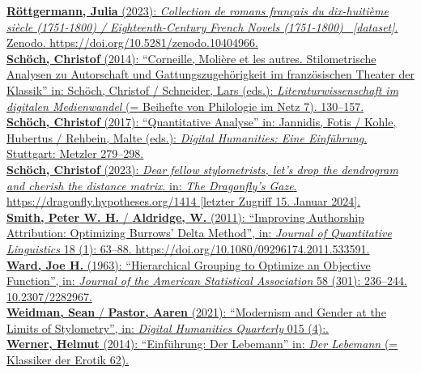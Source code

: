 \documentclass[
  letterpaper,
  DIV=11,
  numbers=noendperiod]{scrreprt}
\begin{document}
\href{https://www.zotero.org/google-docs/?4xA93b}{\textbf{Röttgermann,
Julia} (2023): \emph{Collection de romans français du dix-huitième
siècle (1751-1800) / Eighteenth-Century French Novels (1751-1800)~
{[}dataset{]}}. Zenodo. https://doi.org/10.5281/zenodo.10404966.}\\
\href{https://www.zotero.org/google-docs/?4xA93b}{\textbf{Schöch,
Christof} (2014): ``Corneille, Molière et les autres. Stilometrische
Analysen zu Autorschaft und Gattungszugehörigkeit im französischen
Theater der Klassik'' in: Schöch, Christof / Schneider, Lars (eds.):
\emph{Literaturwissenschaft im digitalen Medienwandel} (= Beihefte von
Philologie im Netz 7). 130--157.}\\
\href{https://www.zotero.org/google-docs/?4xA93b}{\textbf{Schöch,
Christof} (2017): ``Quantitative Analyse'' in: Jannidis, Fotis / Kohle,
Hubertus / Rehbein, Malte (eds.): \emph{Digital Humanities: Eine
Einführung}. Stuttgart: Metzler 279--298.}\\
\href{https://www.zotero.org/google-docs/?4xA93b}{\textbf{Schöch,
Christof} (2023): \emph{Dear fellow stylometrists, let's drop the
dendrogram and cherish the distance matrix}. in: \emph{The Dragonfly's
Gaze}. https://dragonfly.hypotheses.org/1414 {[}letzter Zugriff 15.
Januar 2024{]}.}\\
\href{https://www.zotero.org/google-docs/?4xA93b}{\textbf{Smith, Peter
W. H.} / \textbf{Aldridge, W.} (2011): ``Improving Authorship
Attribution: Optimizing Burrows' Delta Method'', in: \emph{Journal of
Quantitative Linguistics} 18 (1): 63--88.
https://doi.org/10.1080/09296174.2011.533591.}\\
\href{https://www.zotero.org/google-docs/?4xA93b}{\textbf{Ward, Joe H.}
(1963): ``Hierarchical Grouping to Optimize an Objective Function'', in:
\emph{Journal of the American Statistical Association} 58 (301):
236--244. 10.2307/2282967.}\\
\href{https://www.zotero.org/google-docs/?4xA93b}{\textbf{Weidman, Sean}
/ \textbf{Pastor, Aaren} (2021): ``Modernism and Gender at the Limits of
Stylometry'', in: \emph{Digital Humanities Quarterly} 015 (4):.}\\
\href{https://www.zotero.org/google-docs/?4xA93b}{\textbf{Werner,
Helmut} (2014): ``Einführung: Der Lebemann'' in: \emph{Der Lebemann} (=
Klassiker der Erotik 62).}

\section{}\label{section-1}
\end{document}

